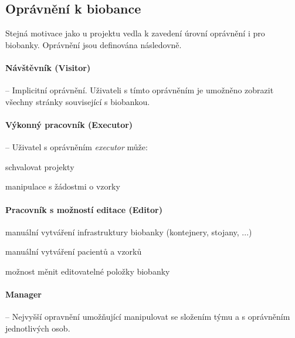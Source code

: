 \subsection{Oprávnění k biobance}
Stejná motivace jako u projektu vedla k zavedení úrovní oprávnění i pro biobanky. Oprávnění jsou definována následovně. 
\paragraph*{Návštěvník (Visitor)} -- Implicitní oprávnění. Uživateli s tímto oprávněním je umožněno zobrazit všechny stránky související s biobankou.
\paragraph*{Výkonný pracovník (Executor)} -- Uživatel s oprávněním \textit{executor} může:
\begin{compactitem}
	\item schvalovat projekty
	\item manipulace s žádostmi o vzorky
\end{compactitem}
\paragraph*{Pracovník s možností editace (Editor)} 
\begin{compactitem}
	\item manuální vytváření infrastruktury biobanky (kontejnery, stojany, ...)
	\item manuální vytváření pacientů a vzorků
	\item možnost měnit editovatelné položky biobanky
\end{compactitem}
\paragraph*{Manager} -- Nejvyšší opravnění umožňující manipulovat se složením týmu a s oprávněním jednotlivých osob.

